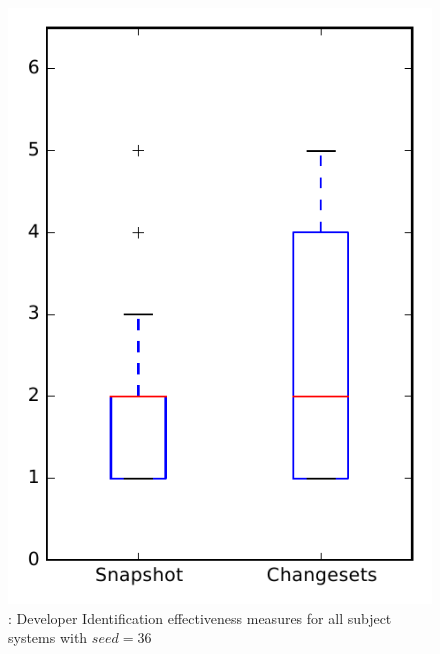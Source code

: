 
\begin{figure}
\centering
\includegraphics[height=0.4\textheight]{figures/dit_seed/rq1_overview_36}
\caption{\rtwo: Developer Identification effectiveness measures for all subject systems with $seed=36$}
\label{fig:dit_seed:rq1:overview}
\end{figure}
